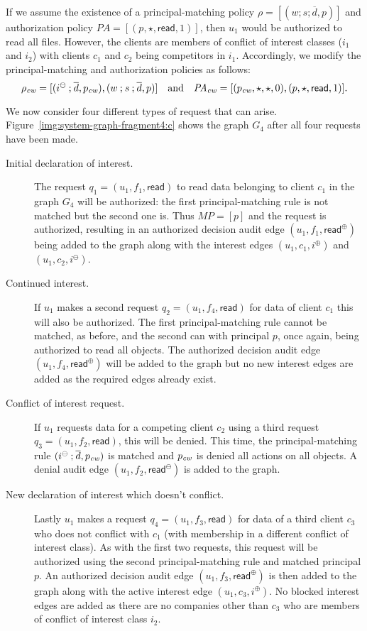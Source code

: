 \documentclass{article}
\newcommand{\comp}{\mathbin{;}}
\newcommand{\audita}[1]{\ensuremath{#1^\oplus}}
\newcommand{\auditd}[1]{\ensuremath{#1^\ominus}}
\newcommand{\interesta}{\ensuremath{i^\oplus}}
\newcommand{\interestb}{\ensuremath{i^\ominus}}
\newcommand{\pa}{\mathit{PA}}
\renewcommand{\mp}{\mathit{MP}}
\begin{document}
If we assume the existence of a principal-matching policy $\rho = [(w \comp s \comp \overline{d}, p)]$ and authorization policy $\pa = [(p,\star,\textsf{read},1)]$, then $u_1$ would be authorized to read all files.
However, the clients are members of conflict of interest classes ($i_1$ and $i_2$) with clients $c_1$ and $c_2$ being competitors in $i_1$.
Accordingly, we modify the principal-matching and authorization policies as follows:
\[
  \rho_{\it cw} = [(\interestb \comp \overline{d}, p_{\it cw}), (w \comp s \comp \overline{d}, p)]\quad\text{and}\quad \pa_{\it cw} = [(p_{\it cw},\star,\star,0),(p,\star,\textsf{read},1)].
\]

We now consider four different types of request that can arise.
Figure~\ref{img:system-graph-fragment4:c} shows the graph $G_4$ after all four requests have been made.
\begin{description}
    \item[Initial declaration of interest.]
    The request $q_1 = (u_1, f_1, \textsf{read})$ to read data belonging to client $c_1$ in the graph $G_4$ will be authorized:
    the first principal-matching rule is not matched but the second one is.
    Thus $\mp = [p]$ and the request is authorized, resulting in an authorized decision audit edge $(u_1, f_1, \audita{\textsf{read}})$ being added to the graph along with the interest edges $(u_1,c_1,\interesta)$ and $(u_1,c_2,\interestb)$. 
    \item[Continued interest.]
    If $u_1$ makes a second request $q_2 = (u_1,f_4,\textsf{read})$ for data of client $c_1$ this will also be authorized.
    The first principal-matching rule cannot be matched, as before, and the second can with principal $p$, once again, being authorized to read all objects.
    The authorized decision audit edge $(u_1, f_4, \audita{\textsf{read}})$ will be added to the graph but no new interest edges are added as the required edges already exist.

    \item[Conflict of interest request.]
    If $u_1$ requests data for a competing client $c_2$ using a third request $q_3 = (u_1,f_2,\textsf{read})$, this will be denied.
    This time, the principal-matching rule $(\interestb \comp \overline{d}, p_{\it cw})$ is matched and $p_{\it cw}$ is denied all actions on all objects.
    A denial audit edge $(u_1,f_2,\auditd{\textsf{read}})$ is added to the graph.

    \item[New declaration of interest which doesn't conflict.]
    Lastly $u_1$ makes a request $q_4 = (u_1,f_3,\textsf{read})$ for data of a third client $c_3$ who does not conflict with $c_1$ (with membership in a different conflict of interest class).
    As with the first two requests, this request will be authorized using the second principal-matching rule and matched principal $p$.
    An authorized decision audit edge $(u_1,f_3,\audita{\textsf{read}})$ is then added to the graph along with the active interest edge $(u_1,c_3,\interesta)$.
    No blocked interest edges are added as there are no companies other than $c_3$ who are members of conflict of interest class $i_2$.

\end{description}
\end{document}
